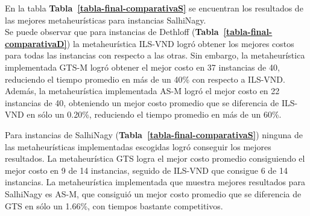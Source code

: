 En la tabla \textbf{Tabla~\ref{tabla-final-comparativaS}} se encuentran los resultados de las mejores metaheurísticas para instancias SalhiNagy.\\

Se puede observar que para instancias de Dethloff (\textbf{Tabla~\ref{tabla-final-comparativaD}}) la metaheurística ILS-VND logró obtener los mejores costos para todas las instancias con respecto a las otras. Sin embargo, la metaheurística implementada GTS-M logró obtener el mejor costo en 37 instancias de 40, reduciendo el tiempo promedio en más de un 40\% con respecto a ILS-VND. Además, la metaheurística implementada AS-M logró el mejor costo en 22 instancias de 40, obteniendo un mejor costo promedio que se diferencia de ILS-VND en sólo un 0.20\%, reduciendo el tiempo promedio en más de un 60\%.

Para instancias de SalhiNagy (\textbf{Tabla~\ref{tabla-final-comparativaS}}) ninguna de las metaheurísticas implementadas escogidas logró conseguir los mejores resultados. La metaheurística GTS logra el mejor costo promedio consiguiendo el mejor costo en 9 de 14 instancias, seguido de ILS-VND que consigue 6 de 14 instancias. La metaheurística implementada que muestra mejores resultados para SalhiNagy es AS-M, que consiguió un mejor costo promedio que se diferencia de GTS en sólo un 1.66\%, con tiempos bastante competitivos.


